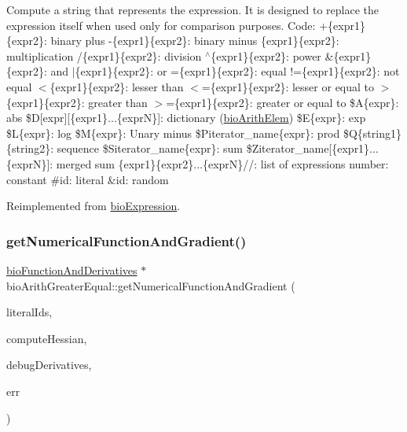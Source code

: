 Compute a string that represents the expression. It is designed to replace the expression itself when used only for comparison purposes. Code\+: +\{expr1\}\{expr2\}\+: binary plus -\/\{expr1\}\{expr2\}\+: binary minus \{expr1\}\{expr2\}\+: multiplication /\{expr1\}\{expr2\}\+: division $^\wedge$\{expr1\}\{expr2\}\+: power \&\{expr1\}\{expr2\}\+: and $\vert$\{expr1\}\{expr2\}\+: or =\{expr1\}\{expr2\}\+: equal !=\{expr1\}\{expr2\}\+: not equal $<$\{expr1\}\{expr2\}\+: lesser than $<$=\{expr1\}\{expr2\}\+: lesser or equal to $>$\{expr1\}\{expr2\}\+: greater than $>$=\{expr1\}\{expr2\}\+: greater or equal to \$A\{expr\}\+: abs \$D\mbox{[}expr\mbox{]}\mbox{[}\{expr1\}...\{exprN\}\mbox{]}\+: dictionary (\hyperlink{classbio_arith_elem}{bio\+Arith\+Elem}) \$E\{expr\}\+: exp \$L\{expr\}\+: log \$M\{expr\}\+: Unary minus \$\+Piterator\+\_\+name\{expr\}\+: prod \$Q\{string1\}\{string2\}\+: sequence \$\+Siterator\+\_\+name\{expr\}\+: sum \$\+Ziterator\+\_\+name\mbox{[}\{expr1\}...\{exprN\}\mbox{]}\+: merged sum \{expr1\}\{expr2\}...\{exprN\}//\+: list of expressions number\+: constant \#id\+: literal \&id\+: random 

Reimplemented from \hyperlink{classbio_expression_a3e4b4dca58dbbc6f0e411b30eb3f60b4}{bio\+Expression}.

\mbox{\label{classbio_arith_greater_equal_aa5ee24b87d59239ca9a0549f72ef8c09}} 
\subsubsection{\texorpdfstring{get\+Numerical\+Function\+And\+Gradient()}{getNumericalFunctionAndGradient()}}
{\footnotesize\ttfamily \hyperlink{classbio_function_and_derivatives}{bio\+Function\+And\+Derivatives} $\ast$ bio\+Arith\+Greater\+Equal\+::get\+Numerical\+Function\+And\+Gradient (\begin{DoxyParamCaption}\item[{vector$<$ pat\+U\+Long $>$}]{literal\+Ids,  }\item[{pat\+Boolean}]{compute\+Hessian,  }\item[{pat\+Boolean}]{debug\+Derivatives,  }\item[{pat\+Error $\ast$\&}]{err }\end{DoxyParamCaption})\hspace{0.3cm}{\ttfamily [virtual]}}

